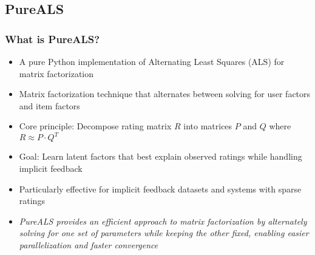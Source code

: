 \documentclass{beamer}
\begin{document}
\subsection{PureALS}
\begin{frame}
\frametitle{What is PureALS?}

\begin{itemize}
    \item A pure Python implementation of Alternating Least Squares (ALS) for matrix factorization
    \item Matrix factorization technique that alternates between solving for user factors and item factors
    \item Core principle: Decompose rating matrix $R$ into matrices $P$ and $Q$ where $R \approx P \cdot Q^T$
    \item Goal: Learn latent factors that best explain observed ratings while handling implicit feedback
    \item Particularly effective for implicit feedback datasets and systems with sparse ratings

    \vspace{1cm}

    \item \textit{PureALS provides an efficient approach to matrix factorization by alternately solving for one set of parameters while keeping the other fixed, enabling easier parallelization and faster convergence}
\end{itemize}
\end{frame}
\end{document}
